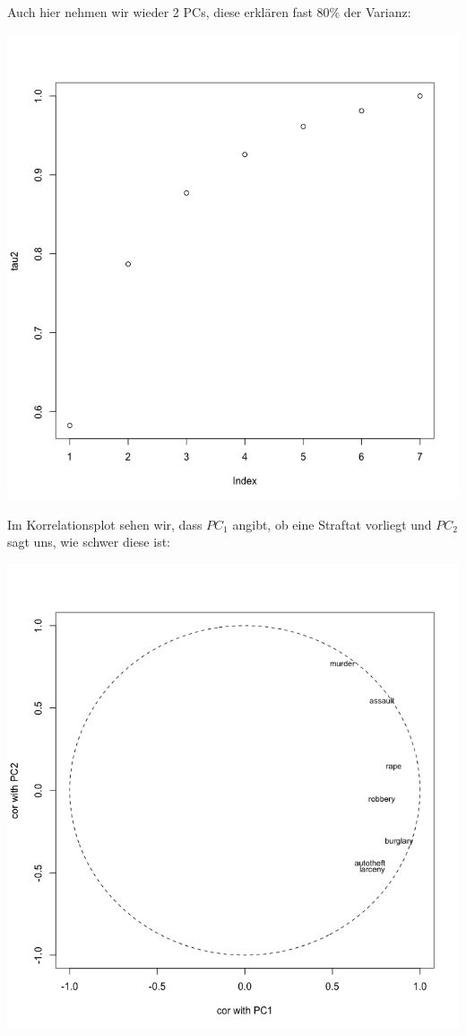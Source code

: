 \documentclass{article}
\begin{document}
	Auch hier nehmen wir wieder 2 PCs, diese erklären fast 80\% der Varianz:
	\begin{center}
		\includegraphics[scale=0.23]{2_3_var}
	\end{center}
	Im Korrelationsplot sehen wir, dass $PC_1$ angibt, ob eine Straftat vorliegt und $PC_2$ sagt uns, wie schwer diese ist:
	\begin{center}
		\includegraphics[scale=0.3]{2_3_cor}
	\end{center}
\end{document}
